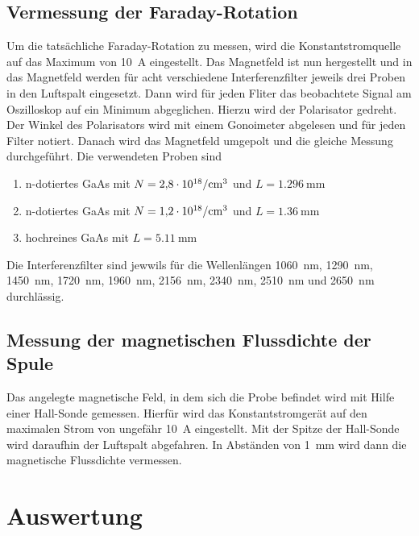 \documentclass[
  bibliography=totoc,     %
  captions=tableheading,  %
  titlepage=firstiscover, %
]{scrartcl}
\begin{document}
\subsection{Vermessung der Faraday-Rotation}
\label{sec:MessungFaraday}

Um die tatsächliche Faraday-Rotation zu messen, wird die Konstantstromquelle
auf das Maximum von \SI{10}{\ampere} eingestellt. Das Magnetfeld ist nun
hergestellt und in das Magnetfeld werden für acht verschiedene Interferenzfilter
jeweils drei Proben in den Luftspalt eingesetzt. Dann wird für jeden
Fliter das beobachtete Signal am Oszilloskop auf ein Minimum abgeglichen.
Hierzu wird der Polarisator gedreht. Der Winkel des Polarisators wird mit einem
Gonoimeter abgelesen und für jeden Filter notiert. 
Danach wird das Magnetfeld umgepolt und die gleiche Messung durchgeführt.
Die verwendeten Proben sind
\begin{enumerate}
  \item n-dotiertes GaAs mit
  $N = \SI{2.8e18}{\raiseto{-3}\centi\meter}$ und
  $L = \SI{1.296}{\milli\meter}$
  \item n-dotiertes GaAs mit
  $N = \SI{1.2e18}{\raiseto{-3}\centi\meter}$ und
  $L = \SI{1.36}{\milli\meter}$
  \item hochreines GaAs mit
  $L = \SI{5.11}{\milli\meter}$
\end{enumerate}
Die Interferenzfilter sind jewwils für die Wellenlängen
\SI{1060}{\nano\meter}, \SI{1290}{\nano\meter}, \SI{1450}{\nano\meter}, \SI{1720}{\nano\meter}, \SI{1960}{\nano\meter}, 
\SI{2156}{\nano\meter}, \SI{2340}{\nano\meter}, \SI{2510}{\nano\meter} und \SI{2650}{\nano\meter} durchlässig.

\subsection{Messung der magnetischen Flussdichte der Spule}
\label{sec:MessungBFeld}

Das angelegte magnetische Feld, in dem sich die Probe befindet wird
mit Hilfe einer Hall-Sonde gemessen.
Hierfür wird das Konstantstromgerät auf den
maximalen Strom von ungefähr \SI{10}{\ampere} eingestellt. Mit der
Spitze der Hall-Sonde wird daraufhin der Luftspalt abgefahren.
In Abständen von \SI{1}{\milli\meter} wird dann die magnetische Flussdichte vermessen.

\section{Auswertung}
\label{sec:Auswertung}
\end{document}
